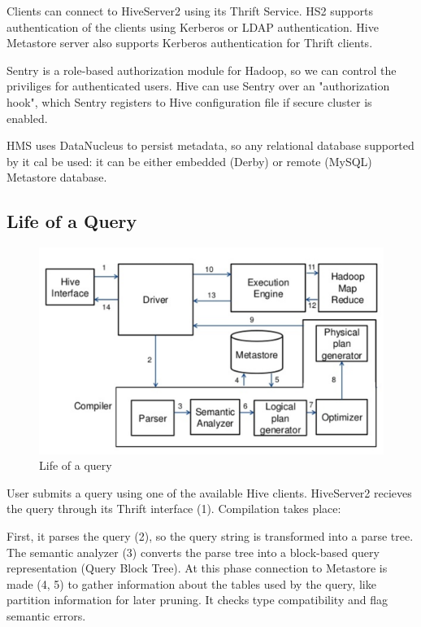 Clients can connect to HiveServer2 using its Thrift Service. HS2 supports authentication of the clients using Kerberos or LDAP authentication. Hive Metastore server also supports Kerberos authentication for Thrift clients.

Sentry is a role-based authorization module for Hadoop, so we can control the priviliges for authenticated users. Hive can use Sentry over an "authorization hook", which Sentry registers to Hive configuration file if secure cluster is enabled. 

HMS uses DataNucleus to persist metadata, so any relational database supported by it cal be used: it can be either embedded (\eg Derby) or remote (\eg MySQL) Metastore database.

\subsection{Life of a Query}
\begin{figure}[H]
	\includegraphics[width=150mm, keepaspectratio]{figures/hive-query.png}
	\centering
	\caption*{Life of a query  \cite{Hive-query-figure}}
\end{figure}
User submits a query using one of the available Hive clients. HiveServer2 recieves the query through its Thrift interface (1). Compilation takes place: 

First, it parses the query (2), so the query string is transformed into a parse tree. The semantic analyzer (3) converts the parse tree into a block-based query representation (Query Block Tree). At this phase connection to Metastore is made (4, 5) to gather information about the tables used by the query, like partition information for later pruning. It checks type compatibility and flag semantic errors. 

